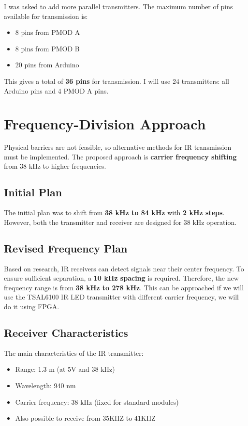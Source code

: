 \documentclass[a4paper,12pt]{article}
\begin{document}
I was asked to add more parallel transmitters. The maximum number of pins available for transmission is:
\begin{itemize}
    \item 8 pins from PMOD A
    \item 8 pins from PMOD B
    \item 20 pins from Arduino
\end{itemize}
This gives a total of \textbf{36 pins} for transmission. I will use 24 transmitters: all Arduino pins and 4 PMOD A pins.

\section{Frequency-Division Approach}

Physical barriers are not feasible, so alternative methods for IR transmission must be implemented. The proposed approach is \textbf{carrier frequency shifting} from 38 kHz to higher frequencies.

\subsection{Initial Plan}
The initial plan was to shift from \textbf{38 kHz to 84 kHz} with \textbf{2 kHz steps}. However, both the transmitter and receiver are designed for 38 kHz operation.

\subsection{Revised Frequency Plan}
Based on research, IR receivers can detect signals near their center frequency. To ensure sufficient separation, a \textbf{10 kHz spacing} is required. Therefore, the new frequency range is from \textbf{38 kHz to 278 kHz}.
This can be approached if we will use the TSAL6100 IR LED transmitter with different carrier frequency, we will do it using FPGA.

\subsection{Receiver Characteristics}
The main characteristics of the IR transmitter:
\begin{itemize}
    \item Range: 1.3 m (at 5V and 38 kHz)
    \item Wavelength: 940 nm
    \item Carrier frequency: 38 kHz (fixed for standard modules)
    \item Also possible to receive from 35KHZ to 41KHZ
\end{itemize}
\end{document}
